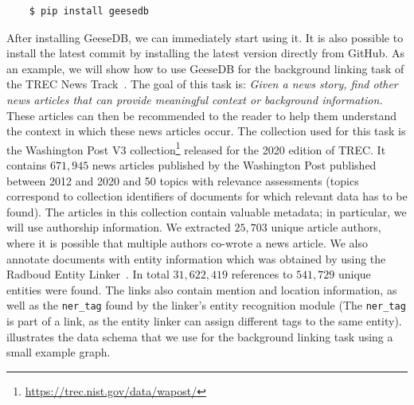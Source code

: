 \begin{verbatim}
	$ pip install geesedb
\end{verbatim}
After installing GeeseDB, we can immediately start using it. It is also possible to install the latest commit by installing the latest version directly from GitHub.
As an example, we will show how to use GeeseDB for the background linking task of the TREC News Track~\citep{soboroff2018trec}. The goal of this task is: \textit{Given a news story, find other news articles that can provide meaningful context or background information.} These articles can then be recommended to the reader to help them understand the context in which these news articles occur. The collection used for this task is the Washington Post V3 collection\footnote{\url{https://trec.nist.gov/data/wapost/}} released for the 2020 edition of TREC. It contains $671,945$ news articles published by the Washington Post published between 2012 and 2020 and 50 topics with relevance assessments (topics correspond to collection identifiers of documents for which relevant data has to be found). The articles in this collection contain valuable metadata; in particular, we will use authorship information. We extracted $25,703$ unique article authors, where it is possible that multiple authors co-wrote a news article. We also annotate documents with entity information which was obtained by using the Radboud Entity Linker~\citep{rel}. In total $31,622,419$ references to $541,729$ unique entities were found. The links also contain mention and location information, as well as the \texttt{ner\_tag} found by the linker's entity recognition module (The \texttt{ner\_tag} is part of a link, as the entity linker can assign different tags to the same entity).  illustrates the data schema that we use for the background linking task using a small example graph. 

